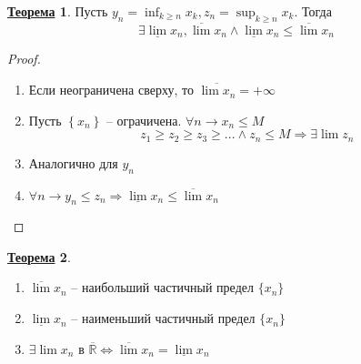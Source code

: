 \documentclass[12pt]{article}
\newenvironment{MyList}[1][4pt]{
  \begin{enumerate}[1.]
  \setlength{\parskip}{0pt}
  \setlength{\itemsep}{#1}
}{       
  \end{enumerate}
}
\def\R{\mathbb{R}}       %
\def\SO{\Rightarrow}     %
\def\EQ{\Leftrightarrow} %
\def\Pagebreak{\pagebreak\vspace*{-1.5em}}
\theoremstyle{definition} %
\newtheorem{Thm}{\underline{Теорема}}[subsection] %
\theoremstyle{plain} %
\theoremstyle{remark} %
\begin{document}
\Pagebreak
\begin{Thm}
    Пусть $y_n = \inf_{k \geqslant n}x_k, z_n = \sup_{k \geqslant n} x_k$. Тогда
    \[\exists \underline{\lim} x_n, \overline{\lim} x_n \wedge \underline{\lim} x_n \leqslant \overline{\lim} x_n\] 
\end{Thm}

\begin{proof}
    \begin{MyList}
        \item Если неограничена сверху, то $\overline{\lim x_n} = +\infty$
        \item Пусть $\left\{x_n\right\}$ -- ограчичена. $\forall n \to x_n \leqslant M$
        \[z_1 \geqslant z_2 \geqslant z_3 \geqslant ... \wedge z_n \leqslant M \SO \exists \lim z_n\]
        \item Аналогично для $y_n$
        \item $\forall n \to y_n \leqslant z_n \SO \underline{\lim}x_n \leqslant \overline{\lim}x_n$  
    \end{MyList}
\end{proof}

\begin{Thm}
    \begin{MyList}
        \item $\overline{\lim} x_n$ -- наибольший частичный предел $\{x_n\}$  
        \item $\underline{\lim} x_n$ -- наименьший частичный предел $\{x_n\}$ 
        \item $\exists \lim x_n$ в $\overline{\R} \EQ \overline{\lim}x_n = \underline{\lim}x_n$  
    \end{MyList}
\end{Thm}
\end{document}
